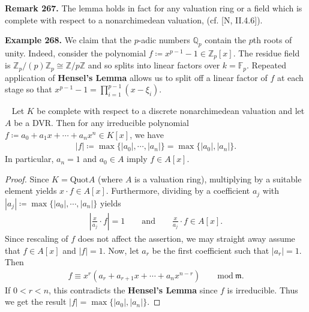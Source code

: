 \documentclass[12pt,a4paper,footinclude=true,headinclude=true]{scrbook} %
\newenvironment{corollary}[2][]
{\renewcommand\theinnercustomcol{#2}\innercustomcol[#1]
\begin{mdframed}[backgroundcolor=gray!20]\ }
{\end{mdframed}\endinnercustomcol}
\newenvironment{remark}[2][Remark]
    { \begin{mdframed}[backgroundcolor=gray!20] \textbf{#1 #2.} }
    {  \end{mdframed}}
\newenvironment{example}[2][Example]
    { \begin{mdframed}[backgroundcolor=gray!20] \textbf{#1 #2.} }
    {  \end{mdframed}}
\begin{document}
\begin{remark}{267}
    The lemma holds in fact for any valuation ring or a field which is complete with respect to a nonarchimedean valuation, (cf. [N, II.4.6]).
\end{remark}

\begin{example}{268}
    \newline We claim that the $p$-adic numbers $\mathbb{Q}_p$ contain the $p$th roots of unity. Indeed, consider the polynomial $f\coloneqq x^{p-1}-1\in\mathbb{Z}_p[x]$. The residue field is $\mathbb{Z}_p/(p)\mathbb{Z}_p\cong\mathbb{Z}/p\mathbb{Z}$ and so splits into linear factors over $k=\mathbb{F}_p$. Repeated application of \textbf{Hensel's Lemma} allows us to split off a linear factor of $f$ at each stage so that $x^{p-1}-1=\prod_{i=1}^{p-1}(x-\xi_i)$.
\end{example}

\begin{corollary}{269}
    Let $K$ be complete with respect to a discrete nonarchimedean valuation and let $A$ be a DVR. Then for any irreducible polynomial $f\coloneqq a_0+a_1x+\cdots+a_nx^n\in K[x]$, we have
    \begin{align*}
        |f|\coloneqq\max\{|a_0|,\cdots,|a_n|\}=\max\{|a_0|,|a_n|\}.
    \end{align*}
    In particular, $a_n=1$ and $a_0\in A$ imply $f\in A[x]$.
\end{corollary}
\begin{proof}
    Since $K=\mathrm{Quot}A$ (where $A$ is a valuation ring), multiplying by a suitable element yields $x\cdot f\in A[x]$. Furthermore, dividing by a coefficient $a_j$ with $|a_j|\coloneqq\max\{|a_0|,\cdots,|a_n|\}$ yields
    \begin{align*}
        |\tfrac{x}{a_j}\cdot f|=1\qquad\text{and}\qquad\tfrac{x}{a_j}\cdot f\in A[x].
    \end{align*}
    Since rescaling of $f$ does not affect the assertion, we may straight away assume that $f\in A[x]$ and $|f|=1$. Now, let $a_r$ be the first coefficient such that $|a_r|=1$. Then 
    \begin{align*}
        f\equiv x^r(a_r+a_{r+1}x+\cdots+a_nx^{n-r})\qquad\mathrm{mod}\ \mathfrak{m}.
    \end{align*}
    If $0<r<n$, this contradicts the \textbf{Hensel's Lemma} since $f$ is irreducible. Thus we get the result $|f|=\max\{|a_0|,|a_n|\}$.
\end{proof}
\end{document}
